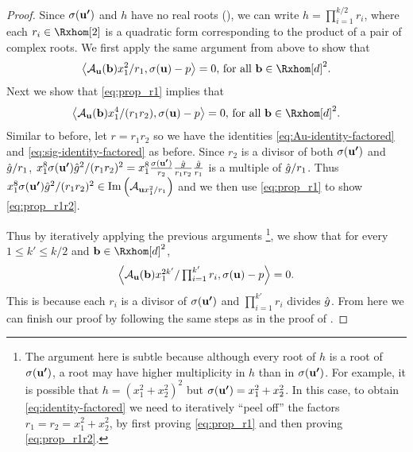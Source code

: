 \documentclass[final,onefignum,onetabnum]{siamart220329}
\begin{document}
\begin{proposition}
\begin{proof}
    Since $\sigma(\boldsymbol{\mathbf{u'}})$ and $h$ have no real roots
    (), we can write $h = \prod_{i=1}^{k/2} r_i$, where
    each $r_i \in \Rxhom[2]$ is a quadratic form corresponding to the product of
    a pair of complex roots. We first apply the same argument from above to show
    that
    \begin{align} \label{eq:prop_r1}
      \dotp{\Aup(\vecp{b}) x_1^2/r_1, \sig(\vecp{u}) - p} = 0,\,
      \text{for all } \vecp{b} \in \Rxhom[d]^2.
    \end{align}
    Next we show that \eqref{eq:prop_r1} implies that
    \begin{align} \label{eq:prop_r1r2}
      \dotp{\Aup(\vecp{b}) x_1^4/(r_1r_2), \sig(\vecp{u}) - p} = 0,\,
      \text{for all } \vecp{b} \in \Rxhom[d]^2.
    \end{align}
    Similar to before, let $r = r_1r_2$ so we have the identities
    \eqref{eq:Au-identity-factored} and \eqref{eq:sig-identity-factored} as
    before. Since $r_2$ is a divisor of both $\sigma(\boldsymbol{\mathbf{u'}})$ and $\hat{g}/r_1$,
    $x_1^{8} \sigma(\boldsymbol{\mathbf{u'}}) \hat{g}^2/(r_1r_2)^2 = x_1^{8}
    \frac{\sigma(\boldsymbol{\mathbf{u'}})}{r_2} \frac{\hat{g}}{r_1r_2} \frac{\hat{g}}{r_1} $ is a
    multiple of $\hat{g}/r_1$. Thus
    $x_1^{8} \sigma(\boldsymbol{\mathbf{u'}}) \hat{g}^2/(r_1r_2)^2 \in
    \operatorname{Im}\left( \mathcal{A}_{\boldsymbol{\mathbf{u}}x_1^2/r_1} \right)$ and we then use
    \eqref{eq:prop_r1} to show \eqref{eq:prop_r1r2}.

    Thus by iteratively applying the previous arguments \footnote{The argument here
      is subtle because although every root of $h$ is a root of
      $\sigma(\boldsymbol{\mathbf{u'}})$, a root may have higher multiplicity in $h$ than in
      $\sigma(\boldsymbol{\mathbf{u'}})$. For example, it is possible that
      $h = (x_1^2 + x_2^2)^2$ but $\sigma(\boldsymbol{\mathbf{u'}}) = x_1^2 + x_2^2$. In this
      case, to obtain \eqref{eq:identity-factored} we need to iteratively ``peel
      off'' the factors $r_1 = r_2 = x_1^2 + x_2^2$, by first proving
      \eqref{eq:prop_r1} and then proving \eqref{eq:prop_r1r2}. }, we show that
    for every $1 \le k' \le k/2$ and $\vecp{b} \in \Rxhom[d]^2$,
    \begin{align*}
      \textstyle
      \left\langle \mathcal{A}_{\boldsymbol{\mathbf{u}}}(\boldsymbol{\mathbf{b}}) x_1^{2k'}/\prod_{i=1}^{k'}r_i, \sigma(\boldsymbol{\mathbf{u}}) - p \right\rangle = 0.
    \end{align*}
    This is because each $r_i$ is a divisor of $\sigma(\boldsymbol{\mathbf{u'}})$ and
    $\prod_{i=1}^{k'}r_i$ divides $\hat{g}$. From here we can finish our proof by
    following the same steps as in the proof of .
  \end{proof}
\end{proposition}
\end{document}
